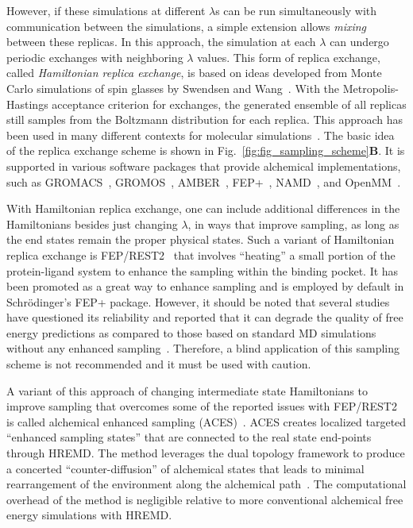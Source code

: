 \documentclass[9pt,bestpractices]{livecoms}
\begin{document}
However, if these simulations at different $\lambda$s can be run simultaneously with communication between the simulations, a simple extension allows \textit{mixing} between these replicas. In this approach, the simulation at each $\lambda$ can undergo periodic exchanges with neighboring $\lambda$ values. This form of replica exchange, called \textit{Hamiltonian replica exchange}, is based on ideas developed from Monte Carlo simulations of spin glasses by Swendsen and Wang~\cite{swendsen1986replica}. With the Metropolis-Hastings acceptance criterion for exchanges, the generated ensemble of all replicas still samples from the Boltzmann distribution for each replica. This approach has been used in many different contexts for molecular simulations~\cite{sugita2000multidimensional,sugita1999replicaexchange, woods2003development, jiang2010free}. The basic idea of the replica exchange scheme is shown in Fig.~\ref{fig:fig_sampling_scheme}\textbf{B}. It is supported in various software packages that provide alchemical implementations, such as GROMACS~\cite{aldeghi2015accurate}, GROMOS~\cite{hritz2008hamiltonian,hritz2007optimization},
AMBER~\cite{Lee_JChemInfModel_2020_v60_p5595,Case_JChemInfModel_2025_v65_p7835}, FEP+~\cite{wang2015accurate}, NAMD~\cite{jiang2019computing}, and OpenMM~\cite{rufa2020chemical,azimi2022relative}.

With Hamiltonian replica exchange, one can include additional differences in the Hamiltonians besides just changing $\lambda$, in ways that improve sampling, as long as the end states remain the proper physical states. Such a variant of Hamiltonian replica exchange is FEP/REST2~\cite{rest2, feprest} that involves ``heating'' a small portion of the protein-ligand system to enhance the sampling within the binding pocket. It has been promoted as a great way to enhance sampling and is employed by default in Schr\"{o}dinger's FEP+ package. However, it should be noted that several studies have questioned its reliability and reported that it can degrade the quality of free energy predictions as compared to those based on standard MD simulations without any enhanced sampling~\cite{wan2020fep+, bhati2022}. Therefore, a blind application of this sampling scheme is not recommended and it must be used with caution. 

A variant of this approach of changing intermediate state Hamiltonians to improve sampling that overcomes some of the reported issues with FEP/REST2 is called alchemical enhanced sampling (ACES)~\cite{lee2023aces}. ACES creates localized targeted ``enhanced sampling states'' that are connected to the real state end-points through HREMD.  The method leverages the dual topology framework to produce a concerted ``counter-diffusion'' of alchemical states that leads to minimal rearrangement of the environment along the alchemical path~\cite{York_ACSPhysChemAu_2023_v3_p478}. The computational overhead of the method is negligible relative to more conventional alchemical free energy simulations with HREMD.
\end{document}
